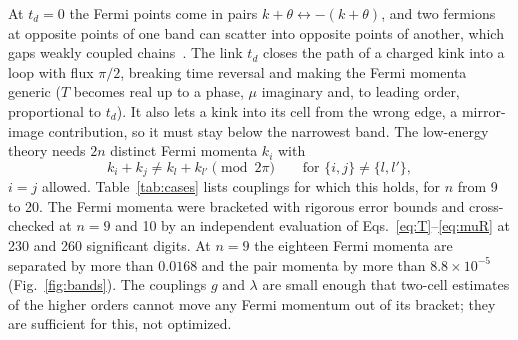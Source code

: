 \documentclass[11pt]{article}
\begin{document}
At $t_d=0$ the Fermi points come in pairs $k+\theta\leftrightarrow-(k+\theta)$, and two fermions at opposite points of one band can scatter into opposite points of another, which gaps weakly coupled chains~\cite{BalentsFisher,LinBalentsFisher}. The link $t_d$ closes the path of a charged kink into a loop with flux $\pi/2$, breaking time reversal and making the Fermi momenta generic ($T$ becomes real up to a phase, $\mu$ imaginary and, to leading order, proportional to $t_d$). It also lets a kink into its cell from the wrong edge, a mirror-image contribution, so it must stay below the narrowest band. The low-energy theory needs $2n$ distinct Fermi momenta $k_i$ with
\begin{equation}
k_i+k_j\ne k_l+k_{l'}\pmod{2\pi}\qquad\text{for }\{i,j\}\ne\{l,l'\},
\label{eq:nonres}
\end{equation}
$i=j$ allowed. Table~\ref{tab:cases} lists couplings for which this holds, for $n$ from 9 to 20. The Fermi momenta were bracketed with rigorous error bounds and cross-checked at $n=9$ and 10 by an independent evaluation of Eqs.~\eqref{eq:T}--\eqref{eq:muR} at 230 and 260 significant digits. At $n=9$ the eighteen Fermi momenta are separated by more than $0.0168$ and the pair momenta by more than $8.8\times10^{-5}$ (Fig.~\ref{fig:bands}). The couplings $g$ and $\lambda$ are small enough that two-cell estimates of the higher orders cannot move any Fermi momentum out of its bracket; they are sufficient for this, not optimized. %
\end{document}
